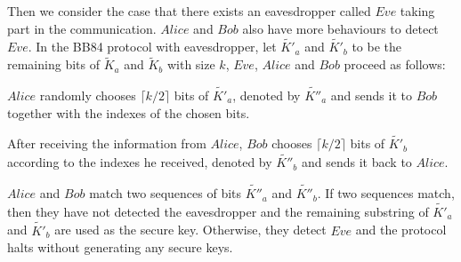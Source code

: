 \documentclass[a4paper,UKenglish,cleveref, autoref]{lipics-v2019}
\begin{document}
Then we consider the case that there exists an eavesdropper called $Eve$ taking part in the communication. $Alice$ and $Bob$ also have more behaviours to detect $Eve$. In the BB84 protocol with eavesdropper, let $\tilde{K'}_a$ and $\tilde{K'}_b$ to be the remaining bits of $\tilde{K}_a$ and $\tilde{K}_b$ with size $k$, $Eve$, $Alice$ and $Bob$ proceed as follows:
\begin{bracketenumerate}
	\item $Alice$ randomly chooses $\lceil k/2\rceil$ bits of $\tilde{K'}_a$, denoted by $\tilde{K''}_a$ and sends it to $Bob$ together with the indexes of the chosen bits.
	\item After receiving the information from $Alice$, $Bob$ chooses $\lceil k/2\rceil$ bits of $\tilde{K'}_b$ according to the indexes he received, denoted by $\tilde{K''}_b$ and sends it back to $Alice$.
	\item $Alice$ and $Bob$ match two sequences of bits $\tilde{K''}_{a}$ and $\tilde{K''}_{b}$. If two sequences match, then they have not detected the eavesdropper and the remaining substring of $\tilde{K'}_{a}$ and $\tilde{K'}_{b}$ are used as the secure key. Otherwise, they detect $Eve$ and the protocol halts without generating any secure keys.
\end{bracketenumerate}
\end{document}

